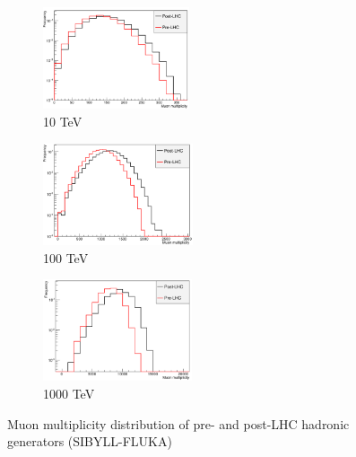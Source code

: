 \documentclass[12pt]{article}
\begin{document}
\begin{figure}[h]
\begin{subfigure}{0.32\textwidth}
\includegraphics[width=0.9\linewidth, height=3cm]{sibyll-lhc-mm10} 
\caption{10 TeV}
\label{fig:sibyll-lhc-mm10}
\end{subfigure}
\begin{subfigure}{0.32\textwidth}
\includegraphics[width=0.9\linewidth, height=3cm]{sibyll-lhc-mm100} 
\caption{100 TeV}
\label{fig:sibyll-lhc-mm100}
\end{subfigure}
\begin{subfigure}{0.32\textwidth}
\includegraphics[width=0.9\linewidth, height = 3cm]{sibyll-lhc-mm1000} 
\caption{1000 TeV}
\label{fig:sibyll-lhc-mm1000}
\end{subfigure}
\caption{Muon multiplicity distribution of pre- and post-LHC hadronic generators (SIBYLL-FLUKA)}
\label{fig:lhc_multiplicity_sibyll}
\end{figure}
\end{document}
